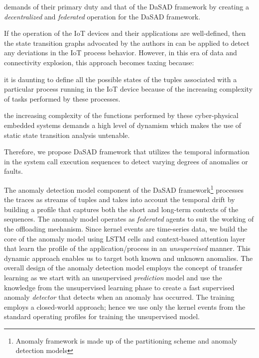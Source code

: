 demands of their primary duty and that of the DaSAD framework by creating a 
\emph{decentralized} and \emph{federated} operation for the DaSAD framework. 
\par  
If the operation of the IoT devices and their applications are well-defined, 
then the state transition graphs advocated by the authors in 
\cite{sumner2013comparative,li2017locating} can be applied to detect any 
deviations in the IoT process behavior. However, in this era of data and 
connectivity explosion, this approach becomes taxing because:
\begin{enumerate*}[label={\alph*)},font={\bfseries}]
	\item it is daunting to define all the possible states of the tuples 
	associated with a particular process running in the IoT device because of 
	the increasing complexity of tasks performed by these processes.
	\item the increasing complexity of the functions performed by these 
	cyber-physical embedded systems demands a high level of dynamism which 
	makes the use of static state transition analysis untenable.
\end{enumerate*}  
Therefore, we propose DaSAD framework that utilizes the temporal information in 
the system call execution sequences to detect varying degrees of anomalies or 
faults. 
\par  
The anomaly detection model component of the DaSAD framework\footnote{Anomaly 
framework is made 
up of the partitioning scheme and anomaly detection models} processes the 
traces as 
streams of tuples and takes into 
account the temporal drift by building a profile that captures both the short 
and long-term contexts of the sequences. The anomaly model operates as 
\emph{federated} agents to suit the working of the offloading mechanism. Since 
kernel events are time-series data, we build the core of the anomaly model 
using LSTM cells and context-based attention layer that learn the profile of 
the application/process in an \emph{unsupervised} manner. This dynamic approach 
enables us to target both known and unknown anomalies. The overall design of 
the anomaly detection model employs the concept of transfer learning as we 
start with an 
unsupervised \emph{prediction} model and use the knowledge from the 
unsupervised 
learning phase to create a fast supervised anomaly \emph{detector} that detects 
when an anomaly has occurred. The training employs a closed-world 
approach; hence we use only the kernel events from the standard operating 
profiles for training the unsupervised model.  \par
